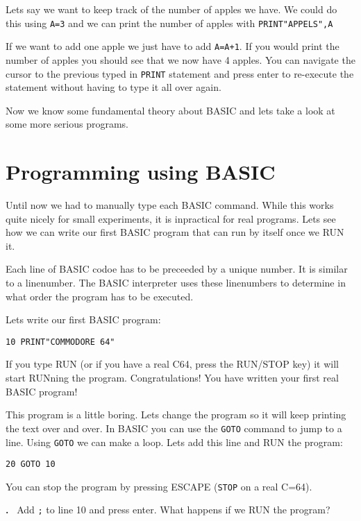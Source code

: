 \documentclass{article}
\newcounter{problem}
\newcounter{solution}
\newcommand\problem{%
  \stepcounter{problem}%
  \textbf{\theproblem.}~%
  \setcounter{solution}{0}%
}
\begin{document}
Lets say we want to keep track of the number of apples we have.
We could do this using \verb:A=3: and we can print the number of apples with \verb:PRINT"APPELS",A:

If we want to add one apple we just have to add \verb:A=A+1:.
If you would print the number of apples you should see that we now have 4 apples.
You can navigate the cursor to the previous typed in \verb:PRINT: statement and press enter to re-execute the statement without having to type it all over again.

Now we know some fundamental theory about BASIC and lets take a look at some more serious programs.

\section{Programming using BASIC}

Until now we had to manually type each BASIC command.
While this works quite nicely for small experiments, it is inpractical for real programs.
Lets see how we can write our first BASIC program that can run by itself once we RUN it.

Each line of BASIC codoe has to be preceeded by a unique number.
It is similar to a linenumber.
The BASIC interpreter uses these linenumbers to determine in what order the program has to be executed.

Lets write our first BASIC program:

\begin{lstlisting}
10 PRINT"COMMODORE 64"
\end{lstlisting}

If you type RUN (or if you have a real C64, press the RUN/STOP key) it will start RUNning the program.
Congratulations! You have written your first real BASIC program!

This program is a little boring.
Lets change the program so it will keep printing the text over and over.
In BASIC you can use the \verb:GOTO: command to jump to a line.
Using \verb:GOTO: we can make a loop.
Lets add this line and RUN the program:

\begin{lstlisting}
20 GOTO 10
\end{lstlisting}

You can stop the program by pressing ESCAPE (\verb:STOP: on a real C=64).

\problem Add \verb:;: to line 10 and press enter. What happens if we RUN the program?
\end{document}
